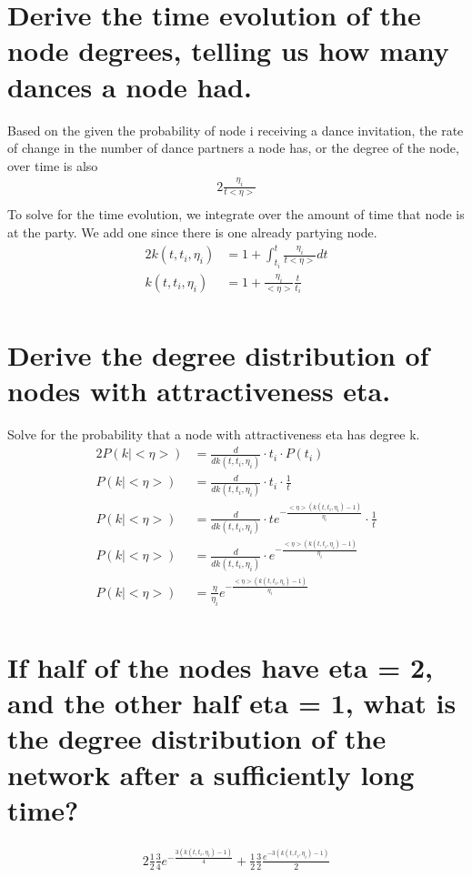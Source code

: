 \documentclass{article}%
\begin{document}
%
\normalsize%
\section{Derive the time evolution of the node degrees, telling us how many dances a node had.}%
\label{sec:Derivethetimeevolutionofthenodedegrees,tellingushowmanydancesanodehad.}%
Based on the given the probability of node i receiving a dance invitation, the rate of change in the number of dance partners a node has, or the degree of the node, over time is also%
\begin{alignat*}{2}%
\frac{\eta_i}{t<\eta>}\\%
\end{alignat*}%
To solve for the time evolution, we integrate over the amount of time that node is at the party. We add one since there is one already partying node.%
\begin{alignat*}{2}%
k(t, t_i, \eta_i) &= 1+\int_{t_i}^{t}\frac{\eta_i}{t<\eta>}dt\\%
k(t, t_i, \eta_i) &= 1+\frac{\eta_i}{<\eta>}\frac{t}{t_i}\\%
\end{alignat*}

%
\section{Derive the degree distribution of nodes with attractiveness eta.}%
\label{sec:Derivethedegreedistributionofnodeswithattractivenesseta.}%
Solve for the probability that a node with attractiveness eta has degree k.%
\begin{alignat*}{2}%
P(k|<\eta>)&=\frac{d}{dk(t, t_i, \eta_i)}\cdot t_i \cdot P(t_i)\\%
P(k|<\eta>)&=\frac{d}{dk(t, t_i, \eta_i)}\cdot t_i \cdot \frac{1}{t}\\%
P(k|<\eta>)&=\frac{d}{dk(t, t_i, \eta_i)}\cdot te^{-\frac{<\eta>(k(t, t_i, \eta_i)-1)}{\eta_i}} \cdot \frac{1}{t}\\%
P(k|<\eta>)&=\frac{d}{dk(t, t_i, \eta_i)}\cdot e^{-\frac{<\eta>(k(t, t_i, \eta_i)-1)}{\eta_i}}\\%
P(k|<\eta>)&=\frac{\eta}{\eta_i}e^{-\frac{<\eta>(k(t, t_i, \eta_i)-1)}{\eta_i}}\\%
\end{alignat*}

%
\section{If half of the nodes have eta = 2, and the other half eta = 1, what is the degree distribution of the network after a sufficiently long time?}%
\label{sec:Ifhalfofthenodeshaveeta=2,andtheotherhalfeta=1,whatisthedegreedistributionofthenetworkafterasufficientlylongtime?}%
\begin{alignat*}{2}%
\frac{1}{2}\frac{3}{4}e^{-\frac{3(k(t, t_i, \eta_i)-1)}{4}} + \frac{1}{2} \frac{3}{2} \frac{e^{-3(k(t, t_i, \eta_i)-1)}}{2}\\%
\end{alignat*}

%
\end{document}

